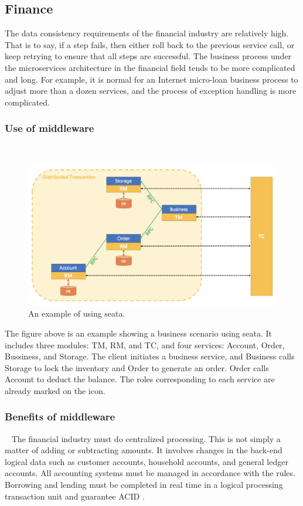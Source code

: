 \documentclass[conference]{IEEEtran}
\begin{document}
\subsection{Finance}
The data consistency requirements of the financial industry are relatively high. That is to say, if a step fails, then either roll back to the previous service call, or keep retrying to ensure that all steps are successful. The business process under the microservices architecture in the financial field tends to be more complicated and long. For example, it is normal for an Internet micro-loan business process to adjust more than a dozen services, and the process of exception handling is more complicated.

\subsubsection{Use of middleware}
\
\newline
\indent

\begin{figure}[h]
\centering
\includegraphics[width=1\columnwidth]{seata2}
\caption{An example of using seata.}
\label{fig}
\end{figure}

The figure above is an example showing a business scenario using seata. It includes three modules: TM, RM, and TC, and four services: Account, Order, Bussiness, and Storage. The client initiates a business service, and Business calls Storage to lock the inventory and Order to generate an order. Order calls Account to deduct the balance. The roles corresponding to each service are already marked on the icon.


\subsubsection{Benefits of middleware}
\
\newline
\indent
The financial industry must do centralized processing. This is not simply a matter of adding or subtracting amounts. It involves changes in the back-end logical data such as customer accounts, household accounts, and general ledger accounts. All accounting systems must be managed in accordance with the rules. Borrowing and lending must be completed in real time in a logical processing transaction unit and guarantee ACID \cite{b14}.
\end{document}
